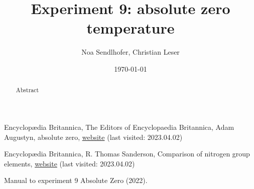 \documentclass[12pt,a4paper]{article}
\title{Experiment 9: absolute zero temperature}
\author{Noa Sendlhofer, Christian Leser}
\date{\today}
\begin{document}
\maketitle

\begin{abstract}
    Abstract
\end{abstract}

\tableofcontents














\begin{thebibliography}{99}

Encyclop\ae dia Britannica, The Editors of Encyclopaedia Britannica, Adam Augustyn, absolute zero, \href{https://www.britannica.com/science/absolute-zero}{website} (last visited: 2023.04.02)

Encyclop\ae dia Britannica, R. Thomas Sanderson, Comparison of nitrogen group elements, \href{https://www.britannica.com/science/nitrogen-group-element/Comparison-of-nitrogen-group-elements}{website} (last visited: 2023.04.02)

Manual to experiment 9 Absolute Zero (2022).


\end{thebibliography}
\end{document}

